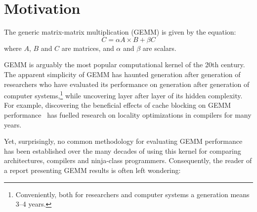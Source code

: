 \documentclass{acm_proc_article-sp} %
\begin{document}



\section{Motivation}

The generic matrix-matrix multiplication (GEMM) is given by the equation:
%
\begin{displaymath} C = \alpha A \times B + \beta C \end{displaymath}
%
\noindent where $A$, $B$ and $C$ are matrices, and $\alpha$ and $\beta$ are
scalars.

GEMM is arguably the most popular computational kernel of the 20th century.
%
The apparent simplicity of GEMM has haunted generation after generation of
researchers who have evaluated its performance on generation after generation
of computer systems,\footnote{Conveniently, both for researchers and computer
systems a generation means 3--4 years.} while uncovering layer after layer of
its hidden complexity.
%
For example, discovering the beneficial effects of cache blocking on GEMM
performance~\cite{Lam:1991} has fuelled research on locality optimizations in
compilers for many years.

%
Yet, surprisingly, no common methodology for evaluating GEMM performance has
been established over the many decades of using this kernel for comparing
architectures, compilers and ninja-class programmers.
%
Consequently, the reader of a report presenting GEMM results is often left wondering:
\end{document}
